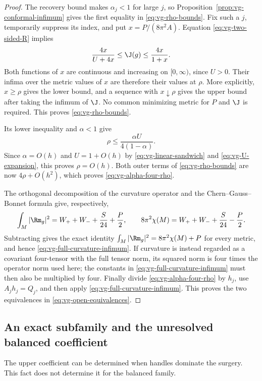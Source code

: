 \begin{proof}
The recovery bound makes $\alpha_j<1$ for large $j$, so
Proposition~\ref{prop:vg-conformal-infimum} gives the first equality in
\eqref{eq:vg-rho-bounds}.  Fix such a $j$, temporarily suppress its
index, and put $x=P/(8\pi^2A)$.  Equation \eqref{eq:vg-two-sided-R}
implies
\[
 \frac{4x}{U+4x}\leq\J(g)\leq\frac{4x}{1+x}.
\]
Both functions of $x$ are continuous and increasing on $[0,\infty)$,
since $U>0$.  Their infima over the metric values of $x$ are therefore
their values at $\rho$.  More explicitly, $x\geq\rho$ gives the lower
bound, and a sequence with $x\downarrow\rho$ gives the upper bound
after taking the infimum of $\J$.  No common minimizing metric for
$P$ and $\J$ is required.  This proves \eqref{eq:vg-rho-bounds}.

Its lower inequality and $\alpha<1$ give
\[
 \rho\leq\frac{\alpha U}{4(1-\alpha)}.
\]
Since $\alpha=O(h)$ and $U=1+O(h)$ by
\eqref{eq:vg-linear-sandwich} and \eqref{eq:vg-U-expansion}, this proves
$\rho=O(h)$.  Both outer terms of \eqref{eq:vg-rho-bounds} are now
$4\rho+O(h^2)$, which proves \eqref{eq:vg-alpha-four-rho}.

The orthogonal decomposition of the curvature operator and the
Chern--Gauss--Bonnet formula give, respectively,
\[
 \int_M|\Rm_g|^2=W_++W_-+\frac S{24}+\frac P2,
 \qquad
 8\pi^2\chi(M)=W_++W_-+\frac S{24}-\frac P2.
\]
Subtracting gives the exact identity
$\int_M|\Rm_g|^2=8\pi^2\chi(M)+P$ for every metric, and hence
\eqref{eq:vg-full-curvature-infimum}.  If curvature is instead regarded
as a covariant four-tensor with the full tensor norm, its squared norm
is four times the operator norm used here; the constants in
\eqref{eq:vg-full-curvature-infimum} must then also be multiplied by four.
Finally divide \eqref{eq:vg-alpha-four-rho} by $h_j$, use
$A_jh_j=Q_j$, and then apply \eqref{eq:vg-full-curvature-infimum}.
This proves the two equivalences in \eqref{eq:vg-open-equivalences}.
\end{proof}

\subsection{An exact subfamily and the unresolved balanced coefficient}

The upper coefficient can be determined when handles dominate the surgery.
This fact does not determine it for the balanced family.

